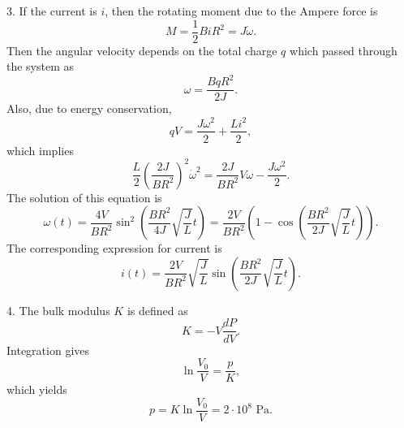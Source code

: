 \documentclass[12pt,a4paper,pdflatex]{disser}
\begin{document}
3. If the current is $i$, then the rotating moment due to the Ampere force is
$$
  M=\frac12 BiR^2=J\dot{\omega}.
$$
Then the angular velocity depends on the total charge $q$ which passed through the system as
$$
  \omega=\frac{BqR^2}{2J}.
$$
Also, due to energy conservation,
$$
  qV=\frac{J\omega^2}{2}+\frac{Li^2}{2},
$$
which implies
$$
  \frac{L}{2}\left(\frac{2J}{BR^2}\right)^2 \dot{\omega}^2=\frac{2J}{BR^2} V\omega-\frac{J\omega^2}{2}.
$$
The solution of this equation is
$$
  \omega(t)=\frac{4V}{BR^2}\sin^2 \left(\frac{BR^2}{4J}\sqrt{\frac{J}{L}}t\right)=\frac{2V}{BR^2}\left(1-\cos\left(\frac{BR^2}{2J}\sqrt{\frac{J}{L}}t\right)\right).
$$
The corresponding expression for current is
$$
  i(t)=\frac{2V}{BR^2}\sqrt{\frac{J}{L}}\sin\left(\frac{BR^2}{2J}\sqrt{\frac{J}{L}}t\right).
$$

4. The bulk modulus $K$ is defined as
$$
  K=-V\frac{dP}{dV}.
$$
Integration gives
$$
  \ln\frac{V_0}{V}=\frac{p}{K},
$$
which yields
$$
  p=K\ln\frac{V_0}{V}=2\cdot 10^8 \text{ Pa}.
$$
\end{document}
